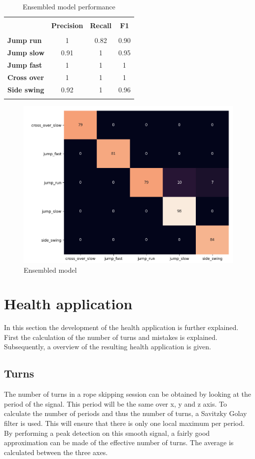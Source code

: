 \documentclass[twocolumn]{phdsymp} %
\begin{document}
\begin{table}[!htpd]
  \centering
  \caption{Ensembled model performance}
  \label{tab:model}
\begin{tabular}{lccc}
 \hline \\
\textbf{}             & \textbf{Precision}  & \textbf{Recall}   & \textbf{F1} &  \\
 \hline \\
\textbf{Jump run}     & 1                   & 0.82              & 0.90       &  \\
\textbf{Jump slow}    & 0.91                & 1                 & 0.95       &  \\
\textbf{Jump fast}    & 1                   & 1                 & 1       &  \\
\textbf{Cross over}   & 1                   & 1                 & 1        &  \\
\textbf{Side swing}   & 0.92                & 1                 & 0.96       & \\
 \hline \\
\end{tabular}
\end{table}

\begin{figure}[!htpd]
\centering
\caption{Ensembled model}\label{fig:model}
\includegraphics[width=.4\textwidth]{images/confusion_matrix_final.PNG}
\end{figure}

\section{Health application}
In this section the development of the health application is further explained. First the calculation of the number of turns and mistakes is explained. Subsequently, a overview of the resulting health application is given.

\subsection{Turns}
The number of turns in a rope skipping session can be obtained by looking at the period of the signal. This period will be the same over x, y and z axis.
To calculate the number of periods and thus the number of turns, a Savitzky Golay filter is used. This will ensure that there is only one local maximum per period. By performing a peak detection on this smooth signal, a fairly good approximation can be made of the effective number of turns. The average is calculated between the three axes.
\end{document}
